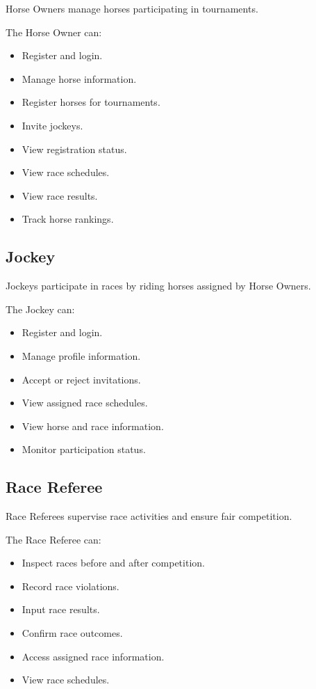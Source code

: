 Horse Owners manage horses participating in tournaments.

The Horse Owner can:

\begin{itemize}
	\item Register and login.
	\item Manage horse information.
	\item Register horses for tournaments.
	\item Invite jockeys.
	\item View registration status.
	\item View race schedules.
	\item View race results.
	\item Track horse rankings.
\end{itemize}

\subsection{Jockey}

Jockeys participate in races by riding horses assigned by Horse Owners.

The Jockey can:

\begin{itemize}
	\item Register and login.
	\item Manage profile information.
	\item Accept or reject invitations.
	\item View assigned race schedules.
	\item View horse and race information.
	\item Monitor participation status.
\end{itemize}

\subsection{Race Referee}

Race Referees supervise race activities and ensure fair competition.

The Race Referee can:

\begin{itemize}
	\item Inspect races before and after competition.
	\item Record race violations.
	\item Input race results.
	\item Confirm race outcomes.
	\item Access assigned race information.
	\item View race schedules.
\end{itemize}

